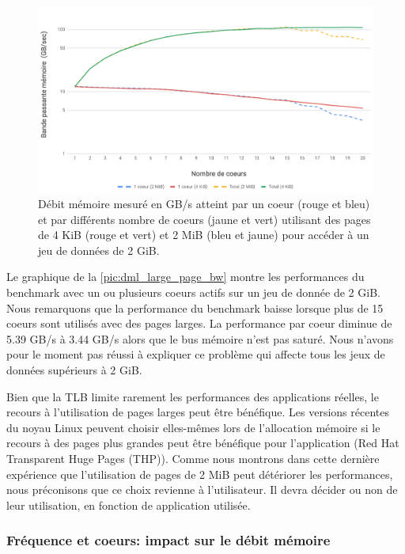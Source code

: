     \begin{figure}
    \center
    \includegraphics[width=14cm]{images/dml_large_page_bw.png}
    \caption{\label{pic:dml_large_page_bw} Débit mémoire mesuré en GB/s atteint par un coeur (rouge et bleu) et par différents nombre de coeurs (jaune et vert) utilisant des pages de 4 KiB (rouge et vert) et 2 MiB (bleu et jaune) pour accéder à un jeu de données de 2 GiB.}
    \end{figure}
    
    Le graphique de la \autoref{pic:dml_large_page_bw} montre les performances du benchmark avec un ou plusieurs coeurs actifs sur un jeu de donnée de 2 GiB. Nous remarquons que la performance du benchmark baisse lorsque plus de 15 coeurs sont utilisés avec des pages larges. La performance par coeur diminue de 5.39 GB/s à 3.44 GB/s alors que le bus mémoire n'est pas saturé. Nous n'avons pour le moment pas réussi à expliquer ce problème qui affecte tous les jeux de données supérieurs à 2 GiB.
    
    Bien que la TLB limite rarement les performances des applications réelles, le recours à l'utilisation de pages larges peut être bénéfique. Les versions récentes du noyau Linux peuvent choisir elles-mêmes lors de l'allocation mémoire si le recours à des pages plus grandes peut être bénéfique pour l'application (Red Hat Transparent Huge Pages (THP)). Comme nous montrons dans cette dernière expérience que l'utilisation de pages de 2 MiB peut détériorer les performances, nous préconisons que ce choix revienne à l'utilisateur. Il devra décider ou non de leur utilisation, en fonction de application utilisée. 
  


    
    \subsubsection{Fréquence et coeurs: impact sur le débit mémoire} \label{sec:dml_core_vs_freq}
    
